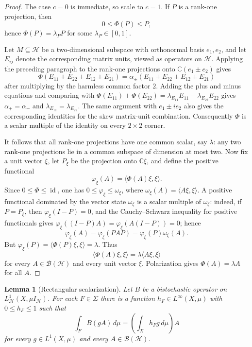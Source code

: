 \documentclass[11pt]{article}
\newtheorem{lemma}{Lemma}
\DeclareMathOperator{\id}{id}
\newcommand{\BH}{\mathcal B(\mathcal H)}
\newcommand{\HH}{\mathcal H}
\newcommand{\ip}[2]{\langle #1,#2\rangle}
\begin{document}
\begin{proof}
The case \(c=0\) is immediate, so scale to \(c=1\).  If \(P\) is a rank-one
projection, then
\[
        0\leq \Phi(P)\leq P,
\]
hence \(\Phi(P)=\lambda_P P\) for some \(\lambda_P\in[0,1]\).

Let \(M\subseteq\HH\) be a two-dimensional subspace with orthonormal basis
\(e_1,e_2\), and let \(E_{ij}\) denote the corresponding matrix units,
viewed as operators on \(\HH\).  Applying the preceding paragraph to the
rank-one projections onto \(\mathbb C(e_1\pm e_2)\) gives
\[
 \Phi(E_{11}+E_{22}\pm E_{12}\pm E_{21})
 =\alpha_\pm(E_{11}+E_{22}\pm E_{12}\pm E_{21})
\]
after multiplying by the harmless common factor \(2\).  Adding the plus and
minus equations and comparing with
\(\Phi(E_{11})+\Phi(E_{22})=\lambda_{E_{11}}E_{11}+\lambda_{E_{22}}E_{22}\)
gives \(\alpha_+=\alpha_-\) and
\(\lambda_{E_{11}}=\lambda_{E_{22}}\).  The same argument with
\(e_1\pm i e_2\) also gives the corresponding identities for the skew
matrix-unit combination.  Consequently \(\Phi\) is a scalar multiple of the
identity on every \(2\times2\) corner.

It follows that all rank-one projections have one common scalar, say
\(\lambda\): any two rank-one projections lie in a common subspace of
dimension at most two.  Now fix a unit vector \(\xi\), let \(P_\xi\) be the
projection onto \(\mathbb C\xi\), and define the positive functional
\[
        \varphi_\xi(A)=\ip{\Phi(A)\xi}{\xi}.
\]
Since \(0\leq\Phi\leq\id\), one has
\(0\leq\varphi_\xi\leq \omega_\xi\), where
\(\omega_\xi(A)=\ip{A\xi}{\xi}\).  A positive functional dominated by the
vector state \(\omega_\xi\) is a scalar multiple of \(\omega_\xi\): indeed,
if \(P=P_\xi\), then \(\varphi_\xi(I-P)=0\), and the Cauchy--Schwarz
inequality for positive functionals gives
\(\varphi_\xi((I-P)A)=\varphi_\xi(A(I-P))=0\); hence
\[
        \varphi_\xi(A)=\varphi_\xi(PAP)=\varphi_\xi(P)\omega_\xi(A).
\]
But \(\varphi_\xi(P)=\ip{\Phi(P)\xi}{\xi}=\lambda\).  Thus
\[
        \ip{\Phi(A)\xi}{\xi}=\lambda\ip{A\xi}{\xi}
\]
for every \(A\in\BH\) and every unit vector \(\xi\).  Polarization gives
\(\Phi(A)=\lambda A\) for all \(A\).
\end{proof}

\begin{lemma}[Rectangular scalarization]\label{lem:rectangles}
Let \(B\) be a bistochastic operator on \(L^1_{\HH}(X,\mu I_{\HH})\).  For
each \(F\in\Sigma\) there is a function \(h_F\in L^\infty(X,\mu)\) with
\(0\leq h_F\leq1\) such that
\[
        \int_F B(gA)\,d\mu=\left(\int_X h_F g\,d\mu\right)A
        \tag{1}\label{eq:TFscalar}
\]
for every \(g\in L^1(X,\mu)\) and every \(A\in\BH\).
\end{lemma}
\end{document}
